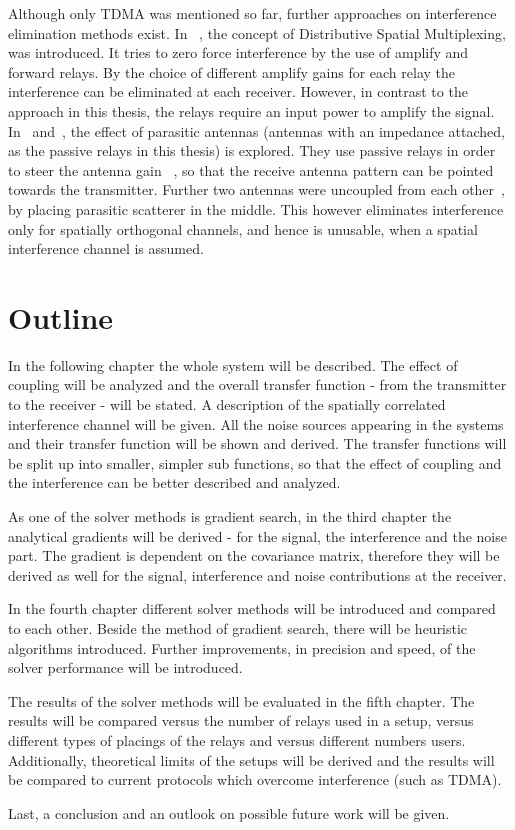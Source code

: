 Although only TDMA was mentioned so far, further approaches on interference elimination methods exist.
In ~\cite{Berger05}, the concept of Distributive Spatial Multiplexing, was introduced.
It tries to zero force interference by the use of amplify and forward relays.
By the choice of different amplify gains for each relay the interference can be eliminated at each receiver.
However, in contrast to the approach in this thesis, the relays require an input power to amplify the signal.
In~\cite{Bains08} and~\cite{Lau12}, the effect of parasitic antennas (antennas with an impedance attached, as the passive relays in this thesis) is explored.
They use passive relays in order to steer the antenna gain~\cite{Bains08}%
, so that the receive antenna pattern can be pointed towards the transmitter.
Further two antennas were uncoupled from each other~\cite{Lau12}, by placing parasitic scatterer in the middle.
This however eliminates interference only for spatially orthogonal channels, and hence is unusable, when a spatial interference channel is assumed.


\section{Outline}
\label{sec:outline}

In the following chapter the whole system will be described.
The effect of coupling will be analyzed and the overall transfer function - from the transmitter to the receiver - will be stated.
A description of the spatially correlated interference channel will be given.
All the noise sources appearing in the systems and their transfer function will be shown and derived.
The transfer functions will be split up into smaller, simpler sub functions, so that the effect of coupling and the interference can be better described and analyzed.

As one of the solver methods is gradient search, in the third chapter the analytical gradients will be derived - for the signal, the interference and the noise part.
The gradient is dependent on the covariance matrix, therefore they will be derived as well for the signal, interference and noise contributions at the receiver.

In the fourth chapter different solver methods will be introduced and compared to each other.
Beside the method of gradient search, there will be heuristic algorithms introduced.
Further improvements, in precision and speed, of the solver performance will be introduced.

The results of the solver methods will be evaluated in the fifth chapter.
The results will be compared versus the number of relays used in a setup,
versus different types of placings of the relays and versus different numbers users.
Additionally, theoretical limits of the setups will be derived and the results will be compared to current protocols which overcome interference (such as TDMA).

Last, a conclusion and an outlook on possible future work will be given.







